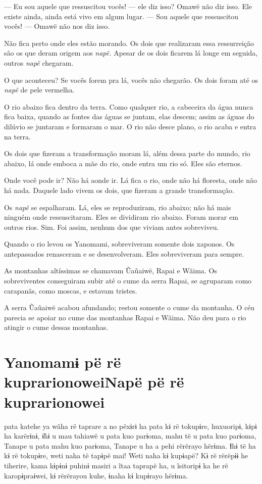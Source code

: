 --- Eu sou aquele que ressuscitou vocês! --- ele diz isso? Omawë não diz
isso. Ele existe ainda, ainda está vivo em algum lugar. --- Sou aquele que
ressuscitou vocês! --- Omawë não nos diz isso. 

Não fica perto onde eles estão morando. Os dois que realizaram essa
ressurreição são os que deram origem aos \textit{napë.} Apesar de os dois
ficarem lá longe em seguida, outros \textit{napë} chegaram. 

O que aconteceu? Se vocês forem pra lá, vocês não chegarão. Os dois
foram até os \textit{napë} de pele vermelha. 

O rio abaixo fica dentro da terra. Como qualquer rio, a cabeceira da
água nunca fica baixa, quando as fontes das águas se juntam, elas
descem; assim as águas do dilúvio se juntaram e formaram o mar. O rio
não desce plano, o rio acaba e entra na terra. 

Os dois que fizeram a transformação moram lá, além dessa parte do mundo,
rio abaixo, lá onde emboca a mãe do rio, onde entra um rio só. Eles são
eternos. 

Onde você pode ir? Não há aonde ir. Lá fica o rio, onde não há floresta,
onde não há nada. Daquele lado vivem os dois, que fizeram a grande
transformação. 

Os \textit{napë} se espalharam. Lá, eles se reproduziram, rio abaixo; não
há mais ninguém onde ressuscitaram. Eles se dividiram rio abaixo. Foram
morar em outros rios. Sim. Foi assim, nenhum dos que viviam
antes sobreviveu. 

Quando o rio levou os Yanomami, sobreviveram somente dois xaponos. Os
antepassados renasceram e se desenvolveram. Eles sobreviveram para
sempre. 

As montanhas altíssimas se chamavam Ũaũaiwë, Rapai e Wãima. Os
sobreviventes conseguiram subir até o cume da serra Rapai, se agruparam
como carapanãs, como moscas, e estavam tristes. 

A serra Ũaũaiwë acabou afundando; restou somente o cume da montanha. O céu parecia se apoiar no cume das montanhas Rapai e Wãima. Não deu para
o rio atingir o cume dessas montanhas. 

\chapter{Yanomamɨ pë rë kuprarionoweiNapë pë rë kuprarionowei}

 pata katehe ya wãha rë taprare a no pëxɨrɨ ha pata kɨ rë tokupɨre,
huxuoripɨ, kɨpɨ ha karërɨnɨ, ɨ̃hɨ u mau tahiawë u pata kuo parɨoma, mahu
të u pata kuo parɨoma, Tanape u pata mahu kuo parɨoma, Tanape u ha a
pehi rërërayo hërɨma. Ɨhɨ të ha kɨ rë tokupɨre, weti naha të tapɨpë mai!
Weti naha kɨ kupɨapë? Kɨ rë rërëpɨɨ he tiherire, kama kɨpɨnɨ puhinɨ
masiri a ĩtaa taprapë ha, u ĩsitoripɨ ka he rë karopɨpraɨwei, kɨ
rërërayou kuhe, ɨnaha kɨ kupɨrayo hërɨma. 

